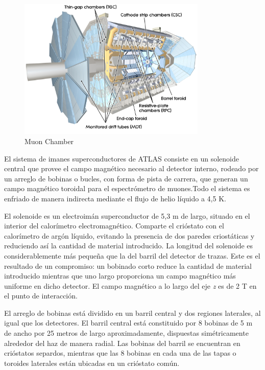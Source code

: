 \begin{figure}[htbp]
  \begin{center}
      \includegraphics[width=0.8\textwidth]{Fig2/MuonChamber.pdf}
    \caption{Muon Chamber}
    \label{fig:MUON1}
  \end{center}
\end{figure}




El sistema de imanes superconductores de ATLAS consiste en un solenoide central que provee el campo magn\'etico necesario al detector interno, rodeado por un arreglo de bobinas o bucles, con forma de pista de carrera, que generan un campo magn\'etico toroidal para el espectr\'ometro de muones.Todo el sistema es enfriado de manera indirecta mediante el flujo de helio l\'iquido a 4,5 K.

   El solenoide es un electroim\'an superconductor de 5,3 m de largo, situado en el interior del calor\'imetro electromagn\'etico. Comparte el cri\'ostato con el calor\'imetro de arg\'on l\'iquido, evitando la presencia de dos paredes criost\'aticas y reduciendo as\'i la cantidad de material introducido. La longitud del solenoide es considerablemente m\'as peque\~na que la del barril del detector de trazas. Este es el resultado de un compromiso: un bobinado corto reduce la cantidad de material introducido mientras que uno largo proporciona un campo magn\'etico m\'as uniforme en dicho detector. El campo magn\'etico a lo largo del eje \emph{z} es de 2 T en el punto de interacci\'on.

   El arreglo de bobinas est\'a dividido en un barril central y dos regiones laterales, al igual que los detectores. El barril central est\'a constituido por 8 bobinas de 5 m de ancho por 25 metros de largo aproximadamente, dispuestas sim\'etricamente alrededor del haz de manera radial. Las bobinas del barril se encuentran en cri\'ostatos separdos, mientras que las 8 bobinas en cada una de las tapas o toroides laterales est\'an ubicadas en un cri\'ostato com\'un.

